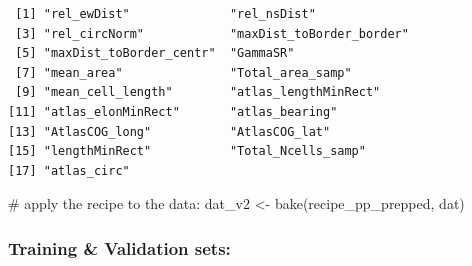 \documentclass[
  letterpaper,
  DIV=11,
  numbers=noendperiod]{scrartcl}
\newenvironment{Shaded}{\begin{snugshade}}{\end{snugshade}}
\newcommand{\AttributeTok}[1]{\textcolor[rgb]{0.40,0.45,0.13}{#1}}
\newcommand{\CommentTok}[1]{\textcolor[rgb]{0.37,0.37,0.37}{#1}}
\newcommand{\ConstantTok}[1]{\textcolor[rgb]{0.56,0.35,0.01}{#1}}
\newcommand{\DecValTok}[1]{\textcolor[rgb]{0.68,0.00,0.00}{#1}}
\newcommand{\FloatTok}[1]{\textcolor[rgb]{0.68,0.00,0.00}{#1}}
\newcommand{\FunctionTok}[1]{\textcolor[rgb]{0.28,0.35,0.67}{#1}}
\newcommand{\NormalTok}[1]{\textcolor[rgb]{0.00,0.23,0.31}{#1}}
\newcommand{\OtherTok}[1]{\textcolor[rgb]{0.00,0.23,0.31}{#1}}
\newcommand{\SpecialCharTok}[1]{\textcolor[rgb]{0.37,0.37,0.37}{#1}}
\begin{document}
\begin{verbatim}
 [1] "rel_ewDist"              "rel_nsDist"             
 [3] "rel_circNorm"            "maxDist_toBorder_border"
 [5] "maxDist_toBorder_centr"  "GammaSR"                
 [7] "mean_area"               "Total_area_samp"        
 [9] "mean_cell_length"        "atlas_lengthMinRect"    
[11] "atlas_elonMinRect"       "atlas_bearing"          
[13] "AtlasCOG_long"           "AtlasCOG_lat"           
[15] "lengthMinRect"           "Total_Ncells_samp"      
[17] "atlas_circ"             
\end{verbatim}

\begin{Shaded}
\begin{Highlighting}[]
\CommentTok{\# apply the recipe to the data:}
\NormalTok{dat\_v2 }\OtherTok{\textless{}{-}} \FunctionTok{bake}\NormalTok{(recipe\_pp\_prepped, dat)}
\end{Highlighting}
\end{Shaded}

\subsubsection{Training \& Validation
sets:}\label{training-validation-sets}

\begin{Shaded}
\end{Shaded}
\end{document}
